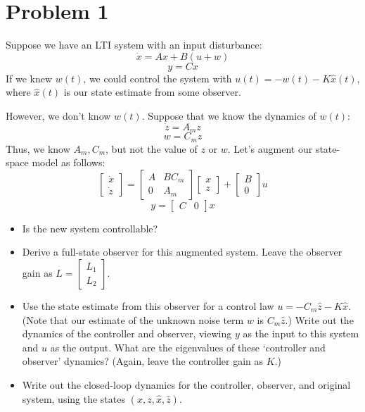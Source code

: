 \documentclass[11pt]{report}
\begin{document}

\section*{Problem 1}

Suppose we have an LTI system with an input disturbance:
\[
\dot x = Ax + B(u+w)
\]
\[
y = Cx
\]
If we knew $w(t)$, we could control the system with $u(t) = -w(t) - K \widehat x(t)$, where $\widehat x(t)$ is our state estimate from some observer.

However, we don't know $w(t)$. Suppose that we know the dynamics of $w(t)$:
\[
\dot z = A_m z
\]
\[
w = C_m z
\]
Thus, we know $A_m, C_m$, but not the value of $z$ or $w$.
Let's augment our state-space model as follows:
\[
\begin{bmatrix}
\dot x \\
\dot z
\end{bmatrix} =
\begin{bmatrix}
A & B C_m \\
0 & A_m
\end{bmatrix}
\begin{bmatrix}
x \\
z
\end{bmatrix} +
\begin{bmatrix}
B \\
0
\end{bmatrix} u
\]
\[
y =
\begin{bmatrix}
C & 0
\end{bmatrix} x
\]
\begin{itemize}
\item
Is the new system controllable?
\item
Derive a full-state observer for this augmented system. Leave the observer gain as $L = \begin{bmatrix}L_1 \\ L_2 \end{bmatrix}$.
\item
Use the state estimate from this observer for a control law $u = -C_m \widehat z - K \widehat x$. (Note that our estimate of the unknown noise term $w$ is $C_m \widehat z$.) Write out the dynamics of the controller and observer, viewing $y$ as the input to this system and $u$ as the output. What are the eigenvalues of these `controller and observer' dynamics? (Again, leave the controller gain as $K$.)
\item
Write out the closed-loop dynamics for the controller, observer, and original system, using the states $(x, z, \widehat x, \widehat z)$.
\end{itemize}
\end{document}
